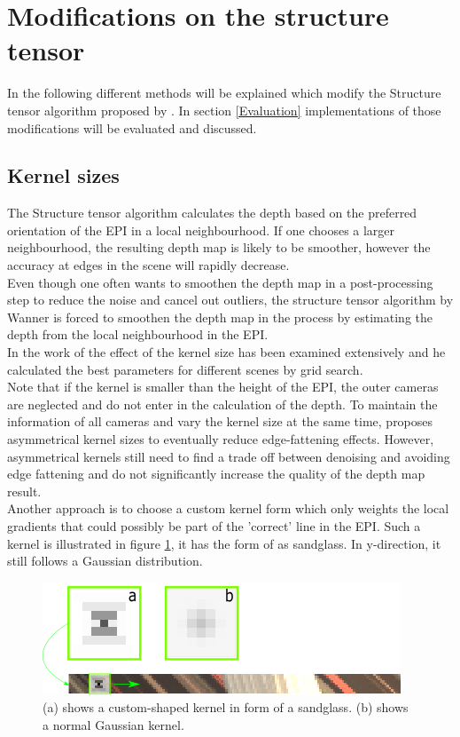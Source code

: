 \documentclass  [
  paper    = a4,
  BCOR     = 10mm,
  twoside,
  fontsize = 12pt,
  fleqn,
  toc      = bibnumbered,
  toc      = listofnumbered,
  numbers  = noendperiod,
  headings = normal,
  listof   = leveldown,
  version  = 3.03
]                                       {scrreprt}
\begin{document}
 \section{Modifications on the structure tensor}
 In the following different methods will be explained which modify the Structure tensor algorithm proposed by \cite{wanner2014orientation}. In section \ref{Evaluation} implementations of those modifications will be evaluated and discussed.
 \subsection{Kernel sizes}
 The Structure tensor algorithm calculates the depth based on the preferred orientation of the EPI in a local neighbourhood. If one chooses a larger neighbourhood, the resulting depth map is likely to be smoother, however the accuracy at edges in the scene will rapidly decrease.\\
 Even though one often wants to smoothen the depth map in a post-processing step to reduce the noise and cancel out outliers, the structure tensor algorithm by Wanner is forced to smoothen the depth map in the process by estimating the depth from the local neighbourhood in the EPI.\\
 In the work of \cite{wanner2014orientation} the effect of the kernel size has been examined extensively and he calculated the best parameters for different scenes by grid search.\\
 Note that if the kernel is smaller than the height of the EPI, the outer cameras are neglected and do not enter in the calculation of the depth. To maintain the information of all cameras and vary the kernel size at the same time, \cite{diebold2016light} proposes asymmetrical kernel sizes to eventually reduce edge-fattening effects. However, asymmetrical kernels still need to find a trade off between denoising and avoiding edge fattening and do not significantly increase the quality of the depth map result.\\
 Another approach is to choose a custom kernel form which only weights the local gradients that could possibly be part of the 'correct' line in the EPI. Such a kernel is illustrated in figure \ref{fig:sandclock},  it has the form of as sandglass. In y-direction, it still follows a Gaussian distribution.
 \begin{figure}
 	\centering
 	\includegraphics[width=0.7\linewidth]{images/sandclock.png}
 	\caption[Sandglass Kernel]{(a) shows a custom-shaped kernel in form of a sandglass. (b) shows a normal Gaussian kernel.}
 	\label{fig:sandclock}
 \end{figure}
 
\end{document}
